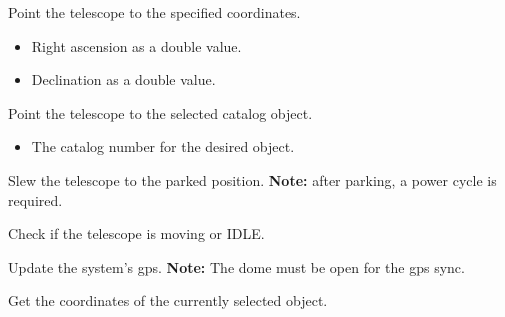 \documentclass[a4paper,english]{article}
\begin{document}
\begin{Description}\setlength{\itemsep}{0cm}
\item[\Arg{goto}] Point the telescope to the specified coordinates.

	     
	
	\begin{itemize}
		\item {} Right ascension as a double value.
		\item {} Declination as a double value.
	\end{itemize}
	
\item[\Arg{messier}] Point the telescope to the selected catalog object.

\item[\Arg{star}]	    
	
\item[\Arg{deepsky}]	    
	
	    
	
	\begin{itemize}
		\item {} The catalog number for the desired object.
	\end{itemize}

\item[\Arg{park}] Slew the telescope to the parked position. \textbf{Note:} after parking, a power cycle is required.

	   

\item[\Arg{status}] Check if the telescope is moving or IDLE.

	   
	
\item[\Arg{gps}] Update the system's gps. \textbf{Note:} The dome must be open for the gps sync.

	   
	
\item[\Arg{getobjradec}] Get the coordinates of the currently selected object.


\end{Description}
\end{document}
